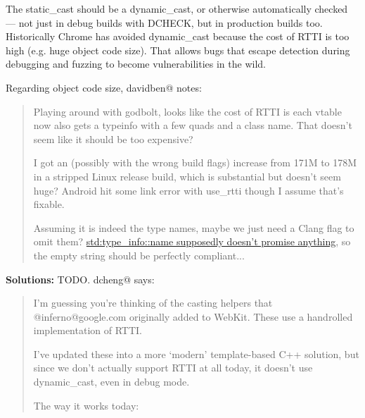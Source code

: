 \documentclass[a4paper,12pt,notitlepage,twoside,openright]{article}
\newcommand{\uline}[1]{#1}
\begin{document}
{The static\_cast should be a dynamic\_cast, or otherwise automatically
checked --- not just in debug builds with DCHECK, but in production
builds too. Historically Chrome has avoided dynamic\_cast because the
cost of RTTI is too high (e.g. huge object code size). That allows bugs
that escape detection during debugging and fuzzing to become
vulnerabilities in the wild.

Regarding object code size, davidben@ notes:

\begin{quote}
Playing around with godbolt, looks like the cost of RTTI is each vtable
now also gets a typeinfo with a few quads and a class name. That doesn't
seem like it should be too expensive?

I got an (possibly with the wrong build flags) increase from 171M to
178M in a stripped Linux release build, which is substantial but doesn't
seem huge? Android hit some link error with use\_rtti though I assume
that's fixable.

Assuming it is indeed the type names, maybe we just need a Clang flag to
omit
them? \href{https://www.google.com/url?q=https://en.cppreference.com/w/cpp/types/type_info/name\&sa=D\&source=editors\&ust=1631944129092000\&usg=AOvVaw1kUlFV7YNfYs6EbGGfwfqk}{\uline{std:type\_info::name supposedly
doesn't promise anything}}, so the empty string should be perfectly
compliant...
\end{quote}

\textbf{Solutions:} TODO. dcheng@ says:

\begin{quote}
I'm guessing you're thinking of the casting helpers that
@inferno@google.com originally added to WebKit. These use a handrolled
implementation of RTTI.

I've updated these into a more `modern' template-based C++ solution, but
since we don't actually support RTTI at all today, it doesn't
use dynamic\_cast, even in debug mode.

The way it works today:
\end{quote}

}
\end{document}
